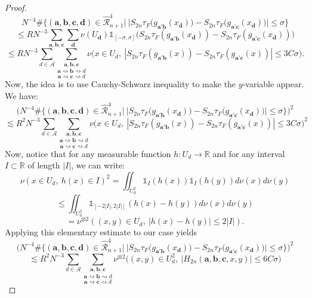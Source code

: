\documentclass[a4paper]{article}
\theoremstyle{definition}
\begin{document}
\begin{proof}
$$ N^{-4} \# \Big\{ (\mathbf{a},\mathbf{b},\mathbf{c},\mathbf{d}) \in \widehat{\mathcal{R}}_{n+1}^4  \Big| \  \big|S_{2n} \tau_F\big( g_{\mathbf{a}'\mathbf{b}}(x_\mathbf{d}) \big) - S_{2n} \tau_F\big( g_{\mathbf{a}'\mathbf{c}}(x_\mathbf{d}) \big) \big| \leq \sigma \Big\} $$
$$ \leq R N^{-3} \sum_{\mathbf{a},\mathbf{b},\mathbf{c}} \sum_{\mathbf{d}} \nu(U_\mathbf{d})  \mathbb{1}_{[-\sigma,\sigma]}\Big( S_{2n} \tau_F(g_{\mathbf{a}'\mathbf{b}}(x_\mathbf{d})) - S_{2n} \tau_F(g_{\mathbf{a}'\mathbf{c}}(x_\mathbf{d})) \Big)   $$
$$ \leq R N^{-3} \sum_{d \in \mathcal{A}} \underset{\mathbf{a} \rightsquigarrow \mathbf{c} \rightsquigarrow d}{\underset{\mathbf{a} \rightsquigarrow \mathbf{b} \rightsquigarrow d}{\sum_{\mathbf{a},\mathbf{b},\mathbf{c}}}} \nu\Big( x \in U_d, \ |S_{2n} \tau_F(g_{\mathbf{a}'\mathbf{b}}(x)) - S_{2n} \tau_F(g_{\mathbf{a}'\mathbf{c}}(x))| \leq 3C \sigma \Big).$$
Now, the idea is to use Cauchy-Schwarz inequality to make the $y$-variable appear. We have:
$$ \Big( N^{-4} \# \Big\{ (\mathbf{a},\mathbf{b},\mathbf{c},\mathbf{d}) \in \widehat{\mathcal{R}}_{n+1}^4  \Big| \  \big|S_{2n} \tau_F\big( g_{\mathbf{a}'\mathbf{b}}(x_\mathbf{d}) \big) - S_{2n} \tau_F\big( g_{\mathbf{a}'\mathbf{c}}(x_\mathbf{d}) \big) \big| \leq \sigma \Big\} \Big)^2 $$
$$ \lesssim R^2 N^{-3} \sum_{d \in \mathcal{A}} \underset{\mathbf{a} \rightsquigarrow \mathbf{c} \rightsquigarrow d}{\underset{\mathbf{a} \rightsquigarrow \mathbf{b} \rightsquigarrow d}{\sum_{\mathbf{a},\mathbf{b},\mathbf{c}}}} \nu\Big( x \in U_d, \ |S_{2n} \tau_F(g_{\mathbf{a}'\mathbf{b}}(x)) - S_{2n} \tau_F(g_{\mathbf{a}'\mathbf{c}}(x))| \leq 3C \sigma \Big)^2 $$
Now, notice that for any measurable function $h : U_d \rightarrow \mathbb{R}$ and for any interval $I \subset \mathbb{R}$ of length $|I|$, we can write:
$$ \nu(x \in U_d, \ h(x) \in I)^2 = \iint_{U_d^2} \mathbb{1}_{I}(h(x)) \mathbb{1}_{I}(h(y)) d\nu(x) d\nu(y) $$
$$ \leq \iint_{U_d^2} \mathbb{1}_{[-2|I|,2|I|]}(h(x)-h(y)) d\nu(x) d\nu(y) $$ $$= \nu^{\otimes 2}( (x,y) \in U_d, \ |h(x)-h(y)| \leq 2 |I| ). $$
Applying this elementary estimate to our case yields
$$ \Big( N^{-4} \# \Big\{ (\mathbf{a},\mathbf{b},\mathbf{c},\mathbf{d}) \in \widehat{\mathcal{R}}_{n+1}^4  \Big| \  \big|S_{2n} \tau_F\big( g_{\mathbf{a}'\mathbf{b}}(x_\mathbf{d}) \big) - S_{2n} \tau_F\big( g_{\mathbf{a}'\mathbf{c}}(x_\mathbf{d}) \big) \big| \leq \sigma \Big\} \Big)^2  $$
$$  \lesssim R^2 N^{-3} \sum_{d \in \mathcal{A}} \underset{\mathbf{a} \rightsquigarrow \mathbf{c} \rightsquigarrow d}{\underset{\mathbf{a} \rightsquigarrow \mathbf{b} \rightsquigarrow d}{\sum_{\mathbf{a},\mathbf{b},\mathbf{c}}}} \nu^{\otimes 2}\Big( (x,y) \in U_d^2, \ |H_{2n}(\mathbf{a},\mathbf{b},\mathbf{c},x,y)| \leq 6C \sigma \Big) $$

\end{proof}
\end{document}
